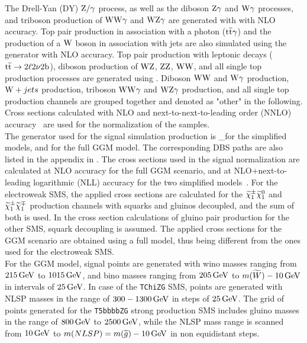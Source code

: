 The Drell-Yan (DY) $\mathrm{Z}/\gamma$ process, as well as the diboson $\mathrm{Z}\gamma$ and $\mathrm{W}\gamma$ processes, and triboson production of $\mathrm{W}\mathrm{W}\gamma$ and $\mathrm{W}\mathrm{Z}\gamma$ are generated with \MADANDMC with NLO accuracy. Top pair production in association with a photon (${\mathrm{t}\overline{\mathrm{t}}}\gamma$) and the production of a $\mathrm{W}$ boson in association with jets are also simulated using the \MADANDMC generator with NLO accuracy. Top pair production with leptonic decays (${\mathrm{t}\overline{\mathrm{t}}}\to 2\ell 2\nu 2\mathrm{b}$), diboson production of $\mathrm{W}\mathrm{Z}$, $\mathrm{Z}\mathrm{Z}$, $\mathrm{W}\mathrm{W}$, and all single top production processes are generated using \POWHEG.
Diboson $\mathrm{W}\mathrm{W}$ and $\mathrm{W}\gamma$ production, $\mathrm{W}+jets$ production, triboson $\mathrm{W}\mathrm{W}\gamma$ and $\mathrm{W}\mathrm{Z}\gamma$ production, and all single top production channels are grouped together and denoted as "other" in the following.
Cross sections calculated with NLO and next-to-next-to-leading order (NNLO) accuracy~\cite{xsec1,xsec2,xsec3,xsec4,xsec5,xsec6,xsec7,xsec8,xsec9} are used for the normalization of the samples.\\
The generator used for the signal simulation production is \MADGRAPH\_\MCATNLO for the simplified models, and  for the full GGM model. The corresponding DBS paths are also listed in the appendix in .
The cross sections used in the signal normalization are calculated at NLO accuracy for the full GGM scenario, and at NLO+next-to-leading logarithmic (NLL) accuracy for the two simplified models~\cite{sxsec1,sxsec2,sxsec3,sxsec4,sxsec5,sxsec6,sxsec7,sxsec8,sxsec9}.
For the electroweak SMS, the applied cross sections are calculated for the $\widetilde{\chi}^\pm_{1}\widetilde{\chi}^{0}_{1}$ and $\widetilde{\chi}^\pm_{1}\widetilde{\chi}^\mp_{1}$ production channels with squarks and gluinos decoupled, and the sum of both is used. In the cross section calculations of gluino pair production for the other SMS, squark decoupling is assumed. The applied cross sections for the GGM scenario are obtained using a full model, thus being different from the ones used for the electroweak SMS.\\
For the GGM model, signal points are generated with wino masses ranging from $215\,\text{Ge\hspace{-.08em}V}$ to $1015\,\text{Ge\hspace{-.08em}V}$, and bino masses ranging from $205\,\text{Ge\hspace{-.08em}V}$ to $m(\widetilde{W})-10\,\text{Ge\hspace{-.08em}V}$ in intervals of $25\,\text{Ge\hspace{-.08em}V}$.
In case of the \texttt{TChiZG} SMS, points are generated with NLSP masses in the range of $300-1300\,\text{Ge\hspace{-.08em}V}$ in steps of $25\,\text{Ge\hspace{-.08em}V}$. The grid of points generated for the \texttt{T5bbbbZG} strong production SMS includes gluino masses in the range of $800\,\text{Ge\hspace{-.08em}V}$ to $2500\,\text{Ge\hspace{-.08em}V}$, while the NLSP mass range is scanned from $10\,\text{Ge\hspace{-.08em}V}$ to $m(NLSP)=m(\widetilde{g})-10\,\text{Ge\hspace{-.08em}V}$ in non equidistant steps.\\
